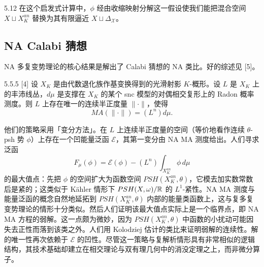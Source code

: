 \begin{remark}{5.12}
在这个启发式计算中，$\phi$ 经由收缩映射分解这一假设使我们能把混合空间 $X\sqcup X_K^{an}$ 替换为其有限逼近 $X\sqcup\Delta_{\mathcal X}$。
\end{remark}


\subsection{NA Calabi 猜想}
NA 多复变势理论的核心结果是解出了 Calabi 猜想的 NA 类比。好的综述见 [5]。

\begin{theorem}{5.5.5}
[4] 设 $X_K$ 是由代数退化族作基变换得到的光滑射影 $K$-概形。设 $L$ 是 $X_K$ 上的丰沛线丛，$d\mu$ 是支撑在 $X_K$ 的某个 snc 模型的对偶相交复形上的 Radon 概率测度。则 $L$ 上存在唯一的连续半正度量 $\|\cdot\|$，使得
\[
MA(\|\cdot\|)=(L^n)d\mu.
\]
\end{theorem}



他们的策略采用「变分方法」。在 $L$ 上连续半正度量的空间（等价地看作连续 $\theta$-psh 势 $\phi$）上存在一个凹能量泛函 $\mathcal E$，其第一变分由 NA MA 测度给出。人们寻求泛函
\[
F_\mu(\phi)=\mathcal E(\phi)-(L^n)\int_{X_K^{an}}\phi\,d\mu
\]
的最大值点：先把 $\phi$ 的空间扩大为函数空间 $PSH(X_K^{an},\theta)$，它模去加实数常数后是紧的；这类似于 Kähler 情形下 $PSH(X,\omega)/\mathbb{R}$ 的 $L^1$-紧性。NA MA 测度与能量泛函的概念自然地延拓到 $PSH(X_K^{an},\theta)$ 内部的能量类函数上，这与复多复变势理论的情形十分类似。然后人们证明该最大值点实际上是一个临界点，即 NA MA 方程的弱解。这一点颇为微妙，因为 $PSH(X_K^{an},\theta)$ 中函数的小扰动可能因失去正性而落到该类之外。人们用 Kolodziej 估计的类比来证明弱解的连续性。解的唯一性再次依赖于 $\mathcal E$ 的凹性。尽管这一策略与复解析情形具有非常相似的逻辑结构，其技术基础却建立在相交理论与双有理几何中的消没定理之上，而非微分算子。


